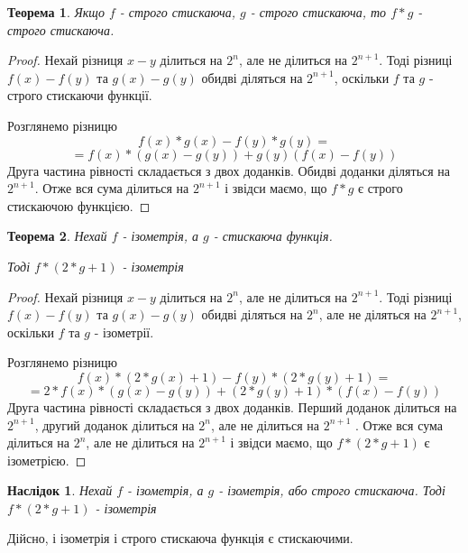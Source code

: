 \documentclass[a4paper,12pt]{article} \usepackage{a4wide}
\numberwithin{equation}{subsection}
\newtheorem{theorem}{Теорема}[subsection]
\newtheorem{corollary}{Наслідок}[subsection]
\begin{document}
\begin{theorem}Якщо $f$ - строго стискаюча, $g$ - строго стискаюча, то
  $f*g$ - строго стискаюча.
\end{theorem}

\begin{proof} Нехай різниця $x-y$ ділиться на $2^n$, але не ділиться
  на $2^{n+1}$. Тоді різниці $f(x)-f(y)$ та $g(x)-g(y)$ обидві
  діляться на $2^{n+1}$, оскільки $f$ та $g$ - строго стискаючи
  функції.

  Розглянемо різницю
  $$f(x)*g(x)-f(y)*g(y)=$$ $$=f(x)*(g(x)-g(y))+g(y)(f(x)-f(y))$$
  Друга частина рівності складається з двох доданків. Обидві доданки
  діляться на $2^{n+1}$. Отже вся сума ділиться на $2^{n+1}$ і звідси
  маємо, що $f*g$ є строго стискаючою функцією.
\end{proof}

\begin{theorem} \label{product} Нехай $f$ - ізометрія, а $g$ -
  стискаюча функція.

  Тоді $f*(2*g+1)$ - ізометрія
\end{theorem}

\begin{proof} Нехай різниця $x-y$ ділиться на $2^n$, але не ділиться
  на $2^{n+1}$. Тоді різниці $f(x)-f(y)$ та $g(x)-g(y)$ обидві
  діляться на $2^n$, але не діляться на $2^{n+1}$, оскільки $f$ та $g$
  - ізометрії.

  Розглянемо різницю
  $$f(x)*(2*g(x)+1)-f(y)*(2*g(y)+1)=$$ $$=2*f(x)*(g(x)-g(y))+(2*g(y)+1)*(f(x)-f(y))$$
  Друга частина рівності складається з двох доданків. Перший доданок
  ділиться на $2^{n+1}$, другий доданок ділиться на $2^n$, але не
  ділиться на $2^{n+1}$ . Отже вся сума ділиться на $2^n$, але не
  ділиться на $2^{n+1}$ і звідси маємо, що $f*(2*g+1)$ є ізометрією.
\end{proof}

  \begin{corollary}
    Нехай $f$ - ізометрія, а $g$ - ізометрія, або строго
    стискаюча. Тоді $f*(2*g+1)$ - ізометрія
  \end{corollary}

  Дійсно, і ізометрія і строго стискаюча функція є стискаючими.
\end{document}

